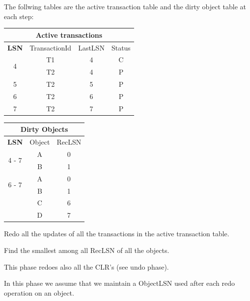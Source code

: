 \documentclass{beamer}
\begin{document}
\begin{slide}{
	\item The follwing tables are the active transaction table and the dirty object table at each step:
	
	\begin{table}
		\tiny
		\begin{tabular}{|c|c|c|c|}
			\hline
			\multicolumn{4}{|c|}{\textbf{Active transactions}} \\
			\hline
			\textbf{LSN} & TransactionId & LastLSN & Status \\
			\hline
			\multirow{2}{*}{4} & T1 & 4 & C \\
			& T2 & 4 & P \\
			\hline
			5 & T2 & 5 & P \\ 
			\hline
			6 & T2 & 6 & P \\
			\hline
			7 & T2 & 7 & P \\
			\hline
		\end{tabular}
	\end{table}
	
	\begin{table}
		\tiny
		\begin{tabular}{|c|c|c|}
			\hline
			\multicolumn{3}{|c|}{\textbf{Dirty Objects}} \\
			\hline
			\textbf{LSN} & Object & RecLSN \\
			\hline
			\multirow{2}{*}{4 - 7} & A & 0 \\
			& B & 1 \\
			\hline
			\multirow{2}{*}{6 - 7} & A & 0 \\
			& B & 1 \\
			& C & 6 \\
			& D & 7 \\
			\hline
		\end{tabular}
	\end{table}
}\end{slide}

\begin{slide}{
	\item Redo all the updates of all the transactions in the active transaction table.
	\item Find the smallest among all RecLSN of all the objects.
	\item This phase redoes also all the CLR's (see undo phase).
	\item In this phase we assume that we maintain a ObjectLSN used after each redo operation on an object. 
}\end{slide}
\end{document}
